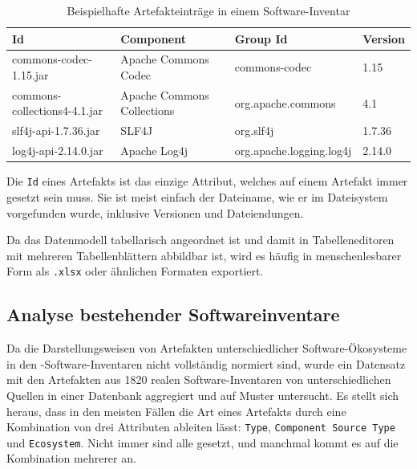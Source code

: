\begin{table}[ht]
    \caption{Beispielhafte Artefakteinträge in einem Software-Inventar}
    \label{tab:inventory-artifact-entries}
    \centering
    \begin{tabular}{llll}
        \toprule
        \textbf{Id}                  & \textbf{Component}         & \textbf{Group Id}        & \textbf{Version} \\
        \midrule
        commons-codec-1.15.jar       & Apache Commons Codec       & commons-codec            & 1.15             \\
        commons-collections4-4.1.jar & Apache Commons Collections & org.apache.commons       & 4.1              \\
        slf4j-api-1.7.36.jar         & SLF4J                      & org.slf4j                & 1.7.36           \\
        log4j-api-2.14.0.jar         & Apache Log4j               & org.apache.logging.log4j & 2.14.0           \\
        \bottomrule
    \end{tabular}
\end{table}

Die \texttt{Id} eines Artefakts ist das einzige Attribut, welches auf einem Artefakt immer gesetzt sein muss.
Sie ist meist einfach der Dateiname, wie er im Dateisystem vorgefunden wurde, inklusive Versionen und Dateiendungen.

Da das Datenmodell tabellarisch angeordnet ist und damit in Tabelleneditoren mit mehreren Tabellenblättern abbildbar ist, wird es häufig in menschenlesbarer Form als \texttt{.xlsx} oder ähnlichen Formaten exportiert.

\subsection{Analyse bestehender Softwareinventare}\label{subsec:analysis-ae-software-inventories}

Da die Darstellungsweisen von Artefakten unterschiedlicher Software-Ökosysteme in den \metaeffekt-Software-Inventaren nicht vollständig normiert sind, wurde ein Datensatz mit den Artefakten aus 1820 realen Software-Inventaren von unterschiedlichen Quellen in einer Datenbank aggregiert und auf Muster untersucht.
Es stellt sich heraus, dass in den meisten Fällen die Art eines Artefakts durch eine Kombination von drei Attributen ableiten lässt: \texttt{Type}, \texttt{Component Source Type} und \texttt{Ecosystem}.
Nicht immer sind alle gesetzt, und manchmal kommt es auf die Kombination mehrerer an.

